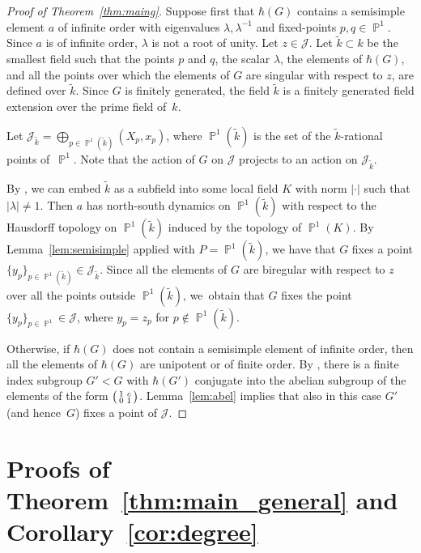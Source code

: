 \documentclass[JEP,XML,SOM,Unicode, NoEqCountersInSection,published]{cedram}
\newenvironment{smallpmatrix}{\big(\begin{smallmatrix}}{\end{smallmatrix}\big)}
\newcommand{\p}{\operatorname{\mathbb{P}}}\let\P\p
\newcommand{\Jon}{\mathscr{J}}
\theoremstyle{plain}
\theoremstyle{definition}
\begin{document}
\begin{proof}[Proof of Theorem~\ref{thm:maing}]
Suppose first that $\hbar(G)$ contains a semisimple element $a$ of infinite order with eigenvalues $\lambda, \lambda^{-1}$ and fixed-points $p,q\in \p^1$. Since $a$ is of infinite order, $\lambda$ is not a root of unity. Let $z\in \Jon$. Let $\tilde{k}\subset k$ be the smallest field such that the points $p$ and $q$, the scalar $\lambda$, the elements of $\hbar(G)$, and all the points over which the elements of $G$ are singular with respect to $z$, are defined over $\tilde{k}$. Since $G$ is finitely generated, the field $\tilde{k}$ is a finitely generated field extension over the prime field of~$k$.

Let $\Jon_{\tilde{k}}=\bigoplus_{p\in \p^1(\tilde{k})} (X_p,x_p)$, where $\p^1(\tilde{k})$ is the set of the $\tilde k$-rational points of~$\p^1$. Note that the action of $G$ on $\Jon$ projects to an action on $\Jon_{\tilde{k}}$.

By \cite[Th.\,2.65]{drutukapovich}, we can embed $\tilde{k}$ as a subfield into some local field $K$ with norm $|\cdot|$ such that $|\lambda|\neq 1$. Then $a$ has north-south dynamics on $\p^1(\tilde{k})$ with respect to the Hausdorff topology on $\p^1(\tilde{k})$ induced by the topology of $\p^1(K)$. By Lemma~\ref{lem:semisimple} applied with $P=\p^1(\tilde{k})$, we have that $G$ fixes a point $\{y_p\}_{p\in\p^1(\tilde{k})}\in\Jon_{\tilde{k}}$. Since all the elements of $G$ are biregular with respect to $z$ over all the points outside $\p^1(\tilde{k})$, we~obtain that $G$ fixes the point $\{y_p\}_{p\in \p^1}\in\Jon$, where $y_p=z_p$ for $p\notin\p^1(\tilde{k})$.

Otherwise, if $\hbar(G)$ does not contain a semisimple element of infinite order, then all the elements of $\hbar(G)$ are unipotent or of finite order. By \cite[Prop.\,14.46]{drutukapovich}, there is a finite index subgroup $G'<G$ with $\hbar(G')$ conjugate into the abelian subgroup of the elements of the form $\begin{smallpmatrix}
1 & c \\
0 & 1
\end{smallpmatrix}$.
Lemma~\ref{lem:abel} implies that also in this case $G'$ (and hence~$G$) fixes a point of $\Jon$.
\end{proof}

{\section{Proofs of Theorem~\ref{thm:main_general} and Corollary~\ref{cor:degree}}}
\end{document}
